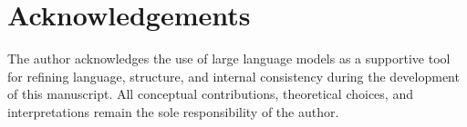 \documentclass[11pt,a4paper]{article}
\begin{document}
  \section*{Acknowledgements}

  The author acknowledges the use of large language models as a supportive tool for
  refining language, structure, and internal consistency during the development of
  this manuscript.
  All conceptual contributions, theoretical choices, and interpretations remain the
  sole responsibility of the author.

  \clearpage
  
      
\end{document}
